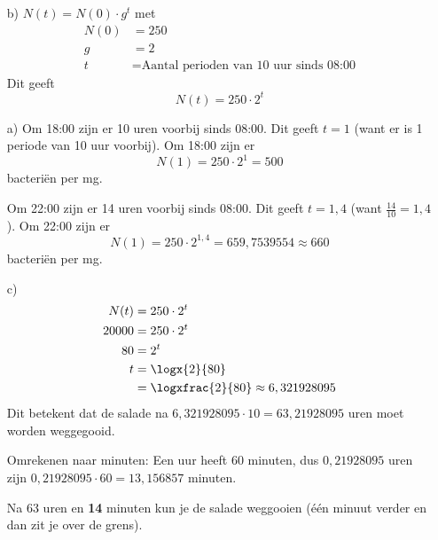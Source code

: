 \begin{antwoord}{17}
\begin{enumerate}
  \item[b)] $N(t) = N(0) \cdot g^t$ met
  \begin{align*}
    N(0) &= 250 \\
    g &= 2 \\
    t &= \text{Aantal perioden van 10 uur sinds 08:00}
  \end{align*}
  Dit geeft \[N(t) = 250 \cdot 2^t\]
  \item[a)] Om 18:00 zijn er 10 uren voorbij sinds 08:00. Dit geeft $t = 1$ (want er is 1 periode van 10 uur voorbij).
  Om 18:00 zijn er \[N(1) = 250 \cdot 2^1 = 500\] bacteri\"en per mg.

  \bigskip
  Om 22:00 zijn er 14 uren voorbij sinds 08:00. Dit geeft $t = 1,4$ (want $\frac{14}{10} = 1,4$).
  Om 22:00 zijn er \[N(1) = 250 \cdot 2^{1,4} = 659,7539554 \approx 660 \] bacteri\"en per mg.
  \item[c)]
  \begin{align*}
    N(t) &= 250 \cdot 2^t \\
    20000 &= 250 \cdot 2^t \\
    80 &= 2^t \\
    t &= \logx{2}{80}\\
    &= \logxfrac{2}{80} \approx 6,321928095
    \end{align*}
    Dit betekent dat de salade na $6,321928095 \cdot 10 = 63,21928095$ uren moet worden weggegooid.

    \medskip
    Omrekenen naar minuten: Een uur heeft 60 minuten, dus $0,21928095 $ uren zijn $0,21928095 \cdot 60 = 13,156857$ minuten.

    \bigskip
    Na 63 uren en \textbf{14} minuten kun je de salade weggooien (\'e\'en minuut verder en dan zit je over de grens).
\end{enumerate}
\end{antwoord}

